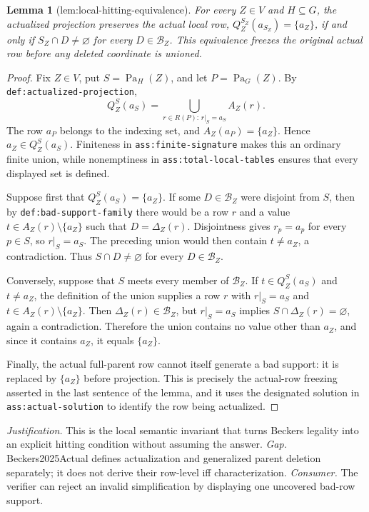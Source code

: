 \documentclass{article}
\newtheorem{lemma}{Lemma}
\begin{document}
\begin{lemma}[lem:local-hitting-equivalence]\label{lem:local-hitting-equivalence}
For every \(Z\in V\) and \(H\subseteq G\), the actualized projection preserves the actual local row, \(Q_Z^{S_Z}(a_{S_Z})=\{a_Z\}\), if and only if \(S_Z\cap D\ne\varnothing\) for every \(D\in\mathcal B_Z\). This equivalence freezes the original actual row before any deleted coordinate is unioned.
\end{lemma}
\begin{proof}
Fix \(Z\in V\), put \(S=\operatorname{Pa}_H(Z)\), and let \(P=\operatorname{Pa}_G(Z)\).  By \texttt{def:actualized-projection},
\[
 Q_Z^S(a_S)=\bigcup_{r\in R(P):\,r|_S=a_S}A_Z(r).
\]
The row \(a_P\) belongs to the indexing set, and \(A_Z(a_P)=\{a_Z\}\).  Hence \(a_Z\in Q_Z^S(a_S)\).  Finiteness in \texttt{ass:finite-signature} makes this an ordinary finite union, while nonemptiness in \texttt{ass:total-local-tables} ensures that every displayed set is defined.

Suppose first that \(Q_Z^S(a_S)=\{a_Z\}\).  If some \(D\in\mathcal B_Z\) were disjoint from \(S\), then by \texttt{def:bad-support-family} there would be a row \(r\) and a value \(t\in A_Z(r)\setminus\{a_Z\}\) such that \(D=\Delta_Z(r)\).  Disjointness gives \(r_p=a_p\) for every \(p\in S\), so \(r|_S=a_S\).  The preceding union would then contain \(t\ne a_Z\), a contradiction.  Thus \(S\cap D\ne\varnothing\) for every \(D\in\mathcal B_Z\).

Conversely, suppose that \(S\) meets every member of \(\mathcal B_Z\).  If \(t\in Q_Z^S(a_S)\) and \(t\ne a_Z\), the definition of the union supplies a row \(r\) with \(r|_S=a_S\) and \(t\in A_Z(r)\setminus\{a_Z\}\).  Then \(\Delta_Z(r)\in\mathcal B_Z\), but \(r|_S=a_S\) implies \(S\cap\Delta_Z(r)=\varnothing\), again a contradiction.  Therefore the union contains no value other than \(a_Z\), and since it contains \(a_Z\), it equals \(\{a_Z\}\).

Finally, the actual full-parent row cannot itself generate a bad support: it is replaced by \(\{a_Z\}\) before projection.  This is precisely the actual-row freezing asserted in the last sentence of the lemma, and it uses the designated solution in \texttt{ass:actual-solution} to identify the row being actualized.
\end{proof}
\par\smallskip\noindent \textit{Justification.} This is the local semantic invariant that turns Beckers legality into an explicit hitting condition without assuming the answer. \textit{Gap.} Beckers2025Actual defines actualization and generalized parent deletion separately; it does not derive their row-level iff characterization. \textit{Consumer.} The verifier can reject an invalid simplification by displaying one uncovered bad-row support.
\end{document}
